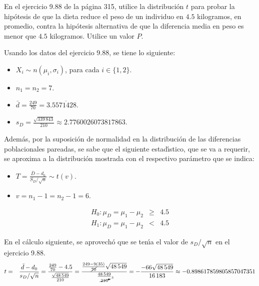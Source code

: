 \begin{enunciado}
 En el ejercicio 9.88 de la p\'agina 315, utilice la distribuci\'on $t$ para probar la hip\'otesis de que la dieta reduce el peso de un individuo en $4.5$ kilogramos, en promedio, contra la hip\'otesis alternativa de que la diferencia media en peso es menor que $4.5$ kilogramos. Utilice un valor $P$.
\end{enunciado}

\begin{solucion}
 \begin{datos}
  Usando los datos del ejercicio 9.88, se tiene lo siguiente:
  \begin{itemize}
   \item $X_i \sim n\left( \mu_i, \sigma_i \right)$,
   para cada $i \in \{ 1, 2 \}$.
   \item $n_1 = n_2 = 7$.
   \item $\bar{d} = \frac{249}{70} = 3.5\overline{571428}$.
   \item $s_D = \frac{\sqrt{339\,843}}{210}
   \approx2.7760026073817863$.
  \end{itemize}
  Adem\'as, por la suposici\'on de normalidad en la distribuci\'on
  de las diferencias poblacionales pareadas,
  se sabe que el siguiente estad\'{\i}stico, que se va a requerir,
  se aproxima a la distribuci\'on mostrada
  con el respectivo par\'ametro que se indica:
  \begin{itemize}
   \item $T = \frac{\overline{D} - d_0}{S_D/\sqrt{n}} \sim t(v)$.
   \item $v = n_1 - 1 = n_2 - 1 = 6$.
  \end{itemize}
 \end{datos}

 \begin{hipotesis}
  \begin{eqnarray*}
   H_0: \mu_D = \mu_1 - \mu_2 & \geq & 4.5 \\
   H_1: \mu_D = \mu_1 - \mu_2 &   <  & 4.5
  \end{eqnarray*}
 \end{hipotesis}

 \begin{estadistico}
  En el c\'alculo siguiente, se aprovech\'o que se ten\'{\i}a
  el valor de $s_D/\sqrt{n}$ en el ejercicio 9.88.
  \begin{eqnarray*}
   t & = & \frac{\bar{d} - d_0}{s_D/\sqrt{n}}
   = \frac{\frac{249}{70} - 4.5}{\frac{\sqrt{48\,549}}{210}}
   = \frac{
   \frac{249 - 9(35)}{\cancel{70}} \sqrt{48\,549} 
   }{
   \frac{48\,549}{\cancelto{3}{210}}
   }
   = -\frac{-66\sqrt{48\,549}}{16\,183}
   \approx -0.898617859805857047351
  \end{eqnarray*}
 \end{estadistico}


\end{solucion}
